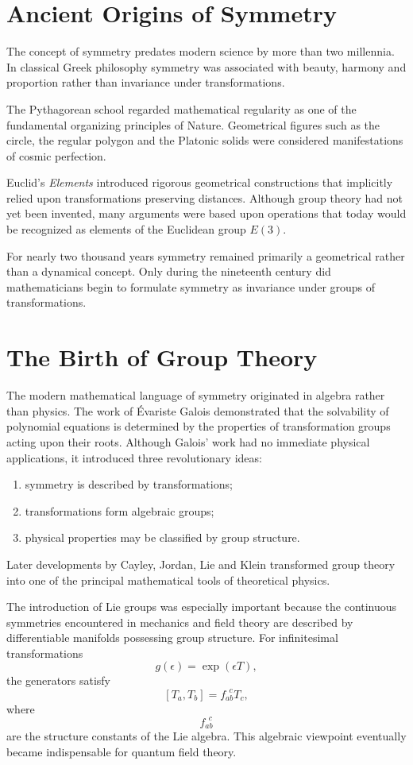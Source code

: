 \section{Ancient Origins of Symmetry}
The concept of symmetry predates modern science by more than two
millennia. In classical Greek philosophy symmetry was associated with
beauty, harmony and proportion rather than invariance under
transformations.

The Pythagorean school regarded mathematical regularity as one of the
fundamental organizing principles of Nature. Geometrical figures such as
the circle, the regular polygon and the Platonic solids were considered
manifestations of cosmic perfection.

Euclid's \emph{Elements} introduced rigorous geometrical constructions
that implicitly relied upon transformations preserving distances.
Although group theory had not yet been invented, many arguments were
based upon operations that today would be recognized as elements of the
Euclidean group $E(3).$

For nearly two thousand years symmetry remained primarily a geometrical
rather than a dynamical concept.
Only during the nineteenth century did mathematicians begin to formulate
symmetry as invariance under groups of transformations.

\section{The Birth of Group Theory}
The modern mathematical language of symmetry originated in algebra rather
than physics.
The work of Évariste Galois demonstrated that the solvability of
polynomial equations is determined by the properties of transformation
groups acting upon their roots.
Although Galois' work had no immediate physical applications, it
introduced three revolutionary ideas:
\begin{enumerate}
\item symmetry is described by transformations;
\item transformations form algebraic groups;
\item physical properties may be classified by group structure.
\end{enumerate}
Later developments by Cayley, Jordan, Lie and Klein transformed group
theory into one of the principal mathematical tools of theoretical
physics.

The introduction of Lie groups was especially important because the
continuous symmetries encountered in mechanics and field theory are
described by differentiable manifolds possessing group structure.
For infinitesimal transformations
\[g(\epsilon)=\exp(\epsilon T),\]
the generators satisfy
\[[T_a,T_b]=f_{ab}^{\ \ c}T_c,\]
where
\[f_{ab}^{\ \ c}\]
are the structure constants of the Lie algebra.
This algebraic viewpoint eventually became indispensable for quantum
field theory.

